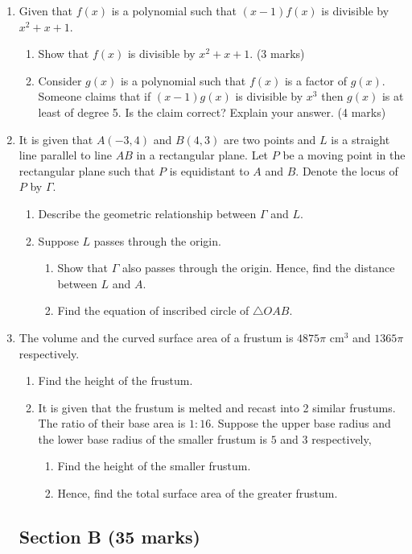 \documentclass[12pt]{article}
\begin{document}
\begin{enumerate}
        \item Given that $f(x)$ is a polynomial such that $(x-1)f(x)$ is divisible by $x^2+x+1$.\begin{enumerate}
            \item Show that $f(x)$ is divisible by $x^2+x+1$. \hfill (3 marks)
            \item Consider $g(x)$ is a polynomial such that $f(x)$ is a factor of $g(x)$. Someone claims that if $(x-1)g(x)$ is divisible by $x^3$ then $g(x)$ is at least of degree 5. Is the claim correct? Explain your answer. \hfill (4 marks)
        \end{enumerate}

        \item It is given that $A(-3,4)$ and $B(4,3)$ are two points and $L$ is a straight line parallel to line $AB$ in a rectangular plane. Let $P$ be a moving point in the rectangular plane such that $P$ is equidistant to $A$ and $B$. Denote the locus of $P$ by $\Gamma$.\begin{enumerate}
            \item Describe the geometric relationship between $\Gamma$ and $L$.
            \item Suppose $L$ passes through the origin.\begin{enumerate}
                \item Show that $\Gamma$ also passes through the origin. Hence, find the distance between $L$ and $A$.
                \item Find the equation of inscribed circle of $\triangle OAB$.
            \end{enumerate}
        \end{enumerate} 

        \item The volume and the curved surface area of a frustum is $4875\pi$ cm$^3$ and $1365\pi$ respectively.\begin{enumerate}
            \item Find the height of the frustum.
            \item It is given that the frustum is melted and recast into 2 similar frustums. The ratio of their base area is $1:16$. Suppose the upper base radius and the lower base radius of the smaller frustum is $5$ and $3$ respectively,\begin{enumerate}
                \item Find the height of the smaller frustum.
                \item Hence, find the total surface area of the greater frustum.
            \end{enumerate}
        \end{enumerate} 

        \subsection*{Section B (35 marks)}
    \end{enumerate}
\end{document}
